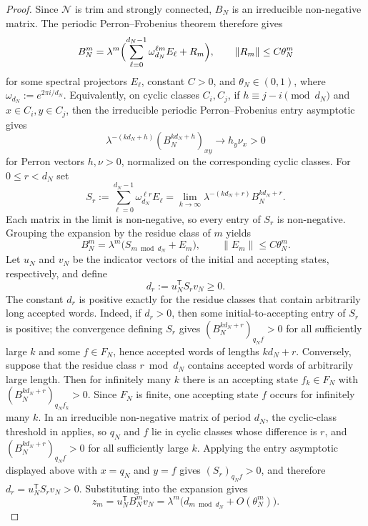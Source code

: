\begin{proof}
  Since \(\mathcal N\) is trim and strongly connected, \(B_N\) is an
  irreducible non-negative matrix. The periodic Perron--Frobenius
  theorem therefore gives
  \[
    B_N^m
    =\lambda^m\Bigl(\sum_{\ell=0}^{d_N-1}\omega_{d_N}^{\ell m}E_\ell+R_m\Bigr),
    \qquad \|R_m\|\le C\theta_N^m
  \]
  for some spectral projectors \(E_\ell\), constant \(C>0\), and
  \(\theta_N\in(0,1)\), where \(\omega_{d_N}:=e^{2\pi i/d_N}\).
  Equivalently, on cyclic classes \(C_i,C_j\), if
  \(h\equiv j-i\pmod {d_N}\) and \(x\in C_i,y\in C_j\), then the
  irreducible periodic Perron--Frobenius entry asymptotic gives
  \[
    \lambda^{-(kd_N+h)}(B_N^{kd_N+h})_{xy}
      \longrightarrow h_y\nu_x>0
  \]
  for Perron vectors \(h,\nu>0\), normalized on the corresponding cyclic
  classes.
  For \(0\le r<d_N\) set
  \[
    S_r:=\sum_{\ell=0}^{d_N-1}\omega_{d_N}^{\ell r}E_\ell
        =\lim_{k\to\infty}\lambda^{-(kd_N+r)}B_N^{kd_N+r}.
  \]
  Each matrix in the limit is non-negative, so every entry of \(S_r\) is
  non-negative. Grouping the expansion by the residue class of \(m\)
  yields
  \[
    B_N^m=\lambda^m\bigl(S_{m\bmod d_N}+E_m\bigr),
    \qquad \|E_m\|\le C\theta_N^m.
  \]
  Let \(u_N\) and \(v_N\) be the indicator vectors of the initial and
  accepting states, respectively, and define
  \[
    d_r:=u_N^{\mathsf T}S_r v_N\ge 0.
  \]
  The constant \(d_r\) is positive exactly for the residue classes that
  contain arbitrarily long accepted words. Indeed, if
  \(d_r>0\), then some initial-to-accepting entry of \(S_r\) is
  positive; the convergence defining \(S_r\) gives
  \((B_N^{kd_N+r})_{q_N f}>0\) for all sufficiently large \(k\) and
  some \(f\in F_N\), hence accepted words of lengths \(kd_N+r\).
  Conversely, suppose that the residue class \(r\bmod d_N\) contains
  accepted words of arbitrarily large length. Then for infinitely many
  \(k\) there is an accepting state \(f_k\in F_N\) with
  \((B_N^{kd_N+r})_{q_N f_k}>0\). Since \(F_N\) is finite, one
  accepting state \(f\) occurs for infinitely many \(k\). In an
  irreducible non-negative matrix of period \(d_N\), the
  cyclic-class threshold in 
  applies, so \(q_N\) and \(f\) lie in cyclic classes whose difference
  is \(r\), and
  \((B_N^{kd_N+r})_{q_N f}>0\) for all sufficiently large \(k\).
  Applying the entry asymptotic displayed above with \(x=q_N\) and
  \(y=f\) gives \((S_r)_{q_N f}>0\), and therefore
  \(d_r=u_N^{\mathsf T}S_rv_N>0\).
  Substituting into the expansion gives
  \[
    z_m=u_N^{\mathsf T}B_N^m v_N
    =\lambda^m\bigl(d_{m\bmod d_N}+O(\theta_N^m)\bigr).
  \]
\end{proof}

